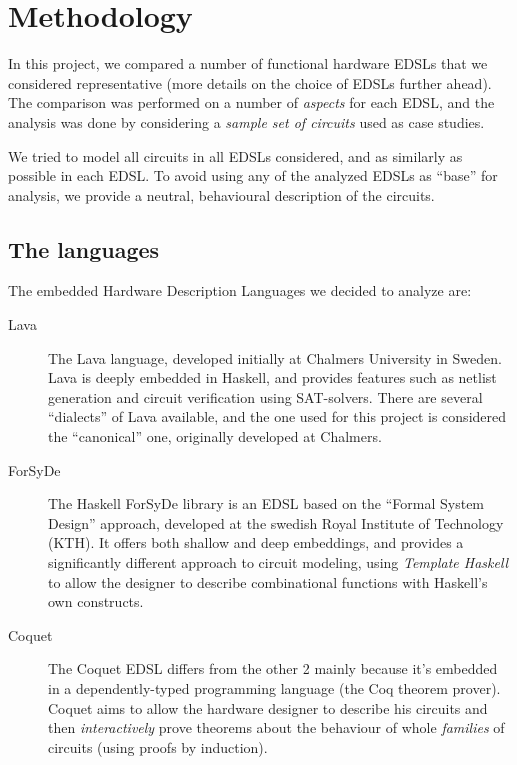 \section{Methodology}
\label{sec:methods}

    In this project, we compared a number of functional hardware EDSLs that we considered
    representative (more details on the choice of EDSLs further ahead). The comparison was performed
    on a number of \emph{aspects} for each EDSL, and the analysis was done by considering a
    \emph{sample set of circuits} used as case studies.

    We tried to model all circuits in all EDSLs considered, and as similarly as possible in each
    EDSL. To avoid using any of the analyzed EDSLs as ``base'' for analysis, we provide a neutral,
    behavioural description of the circuits.

    \subsection{The languages}
    \label{subsec:languages}
        The embedded Hardware Description Languages we decided to analyze are:

        \begin{description}
            \item[Lava] The Lava\cite{lava1998} language, developed initially at Chalmers University
            in Sweden.  Lava is deeply embedded in Haskell, and provides features such as netlist
            generation and circuit verification using SAT-solvers. There are several ``dialects'' of
            Lava available, and the one used for this project is considered the ``canonical'' one,
            originally developed at Chalmers.

            \item[ForSyDe] The Haskell ForSyDe library is an EDSL based on the ``Formal System
            Design'' approach\cite{forsyde1999}, developed at the swedish Royal Institute of
            Technology (KTH).  It offers both shallow and deep embeddings, and provides a
            significantly different approach to circuit modeling, using \emph{Template Haskell} to
            allow the designer to describe combinational functions with Haskell's own constructs.

            \item[Coquet] The Coquet\cite{coquet2011} EDSL differs from the other 2 mainly because
            it's embedded in a dependently-typed programming language (the Coq theorem prover).
            Coquet aims to allow the hardware designer to describe his circuits and then
            \emph{interactively} prove theorems about the behaviour of whole \emph{families} of
            circuits (using proofs by induction).
        \end{description}


